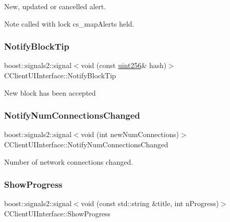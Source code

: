 New, updated or cancelled alert. \begin{DoxyNote}{Note}
called with lock cs\+\_\+map\+Alerts held. 
\end{DoxyNote}
\mbox{\label{class_c_client_u_i_interface_a4bfd5841b9471733b40568ca21eaf010}} 
\subsubsection{\texorpdfstring{Notify\+Block\+Tip}{NotifyBlockTip}}
{\footnotesize\ttfamily boost\+::signals2\+::signal$<$void (const \mbox{\hyperlink{classuint256}{uint256}}\& hash)$>$ C\+Client\+U\+I\+Interface\+::\+Notify\+Block\+Tip}

New block has been accepted \mbox{\label{class_c_client_u_i_interface_a496995d44db8dc3e3ef84d345e25967d}} 
\subsubsection{\texorpdfstring{Notify\+Num\+Connections\+Changed}{NotifyNumConnectionsChanged}}
{\footnotesize\ttfamily boost\+::signals2\+::signal$<$void (int new\+Num\+Connections)$>$ C\+Client\+U\+I\+Interface\+::\+Notify\+Num\+Connections\+Changed}

Number of network connections changed. \mbox{\label{class_c_client_u_i_interface_a64e516e507dd74f3639c51dffa645af2}} 
\subsubsection{\texorpdfstring{Show\+Progress}{ShowProgress}}
{\footnotesize\ttfamily boost\+::signals2\+::signal$<$void (const std\+::string \&title, int n\+Progress)$>$ C\+Client\+U\+I\+Interface\+::\+Show\+Progress}

